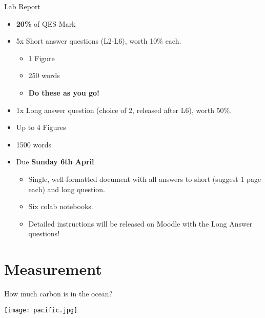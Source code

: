 \documentclass[aspectratio=169]{beamer}
\begin{document}
\begin{frame}{Lab Report}
    \begin{itemize}
        \item \textbf{20\%} of QES Mark
        \item 5x Short answer questions (L2-L6), worth 10\% each.
        \begin{itemize}
            \item 1 Figure
            \item 250 words
            \item \textbf{Do these as you go!}
        \end{itemize}
        \item 1x Long answer question (choice of 2, released after L6), worth 50\%.
        \item Up to 4 Figures
        \item 1500 words
        \item Due \textbf{Sunday 6th April}
        \begin{itemize}
            \item Single, well-formatted document with all answers to short (suggest 1 page each) and long question.
            \item Six colab notebooks.
            \item Detailed instructions will be released on Moodle with the Long Answer questions!
        \end{itemize} 
    \end{itemize}
\end{frame}


\section{Measurement}

\begin{frame}{How much carbon is in the ocean?}
    \begin{center}
        \texttt{[image: pacific.jpg]}    
    \end{center}
    
\end{frame}
\end{document}
